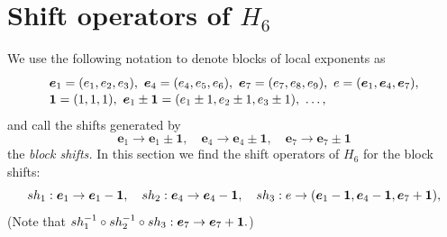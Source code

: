 \documentclass[a4paper,12pt]{article}
\theoremstyle{definition}
\theoremstyle{remark}
\numberwithin{equation}{section} %
\begin{document}
\newpage

\section{Shift operators of $H_6$}\label{shiftopH6}\secttoc
We use the following notation to denote blocks of local exponents as
\[ \def\arraystretch{1.1} \begin{array}{l}
  {\bm e}_1=(e_1,e_2,e_3),\ {\bm e}_4=(e_4,e_5,e_6),\ {\bm e}_7=(e_7,e_8,e_9),\ 
  e=({\bm e}_1,{\bm e}_4,{\bm e}_7),\\ {\bf 1}=(1,1,1), \ 
  {\bm e}_1\pm{\bf 1}=(e_1\pm1,e_2\pm1,e_3\pm1),\ \dots,
\end{array}\]
and call the shifts generated by 
$$ {\bm e}_1\to {\bm e}_1\pm {\bm 1},\quad{\bm e}_4\to {\bm e}_4\pm {\bm 1},\quad{\bm e}_7\to {\bm e}_7\pm {\bm 1}$$
the {\it block shifts.} In this section we find the shift operators of $H_6$ for the block shifts:
  $$%
  sh_1:{\bm e}_1\to{\bm e}_1-{\bf1},\quad
  sh_2:{\bm e}_4\to{\bm e}_4-{\bf1},\quad
  sh_3:e\to ({\bm e}_1-{\bm 1},{\bm e}_4-{\bm1},{\bm e}_7+{\bm 1}),
$$%
  (Note that $sh_1^{-1}\circ sh_2^{-1}\circ sh_3:{\bm e}_7\to{\bm e}_7+{\bf1}.$)
\end{document}
